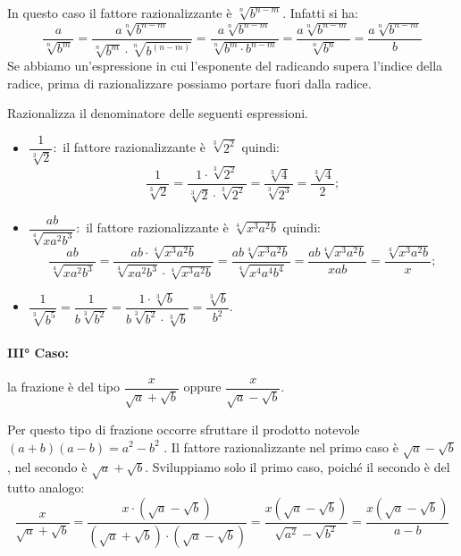 In questo caso il fattore razionalizzante è $\sqrt[n]{b^{n-m}}$. Infatti si ha:
\begin{equation*}
\dfrac a{\sqrt[n]{b^m}}=\dfrac{a\sqrt[n]{b^{n-m}}}{\sqrt[n]{b^m}\cdot \sqrt[n]{b^{(n-m)}}}=\dfrac{a\sqrt[n]{b^{n-m}}}{\sqrt[n]{b^m\cdot b^{n-m}}}=\dfrac{a\sqrt[n]{b^{n-m}}}{\sqrt[n]{b^n}}=\dfrac{a\sqrt[n]{b^{n-m}}} b
\end{equation*}
Se abbiamo un'espressione in cui l'esponente del radicando supera l'indice della radice, prima di razionalizzare possiamo portare fuori dalla radice.

\begin{exrig}
 \begin{esempio}
Razionalizza il denominatore delle seguenti espressioni.
\begin{itemize}
 \item $\dfrac 1{\sqrt[3]2}$:\, il fattore razionalizzante è $\sqrt[3]{2^2}$ quindi:\[\dfrac 1{\sqrt[3]2}=\dfrac{1\cdot \sqrt[3]{2^2}}{\sqrt[3]2\cdot \sqrt[3]{2^2}}=\dfrac{\sqrt[3]4}{\sqrt[3]{2^3}}=\dfrac{\sqrt[3]4} 2;\]
 \item $\dfrac{ab}{\sqrt[4]{xa^2b^3}}$:\, il fattore razionalizzante è $\sqrt[4]{x^3a^2b}$ quindi: \[\dfrac{ab}{\sqrt[4]{xa^2b^3}}=\dfrac{ab\cdot \sqrt[4]{x^3a^2b}}{\sqrt[4]{xa^2b^3}\cdot \sqrt[4]{x^3a^2b}}=\dfrac{ab\sqrt[4]{x^3a^2b}}{\sqrt[4]{x^4a^4b^4}}=\dfrac{ab\sqrt[4]{x^3a^2b}}{xab}=\dfrac{\sqrt[4]{x^3a^2b}} x;\]
 \item $\dfrac 1{\sqrt[3]{b^5}}=\dfrac 1{b\sqrt[3]{b^2}}=\dfrac{1\cdot \sqrt[3]b}{b\sqrt[3]{b^2}\cdot \sqrt[3]b}=\dfrac{\sqrt[3]b}{b^2}$.
\end{itemize}
 \end{esempio}
\end{exrig}


\paragraph{III° Caso:} la frazione è del tipo $\dfrac x{\sqrt a+\sqrt b}$ oppure $\dfrac x{\sqrt a-\sqrt b}$.

Per questo tipo di frazione occorre sfruttare il prodotto notevole $(a+b)(a-b)=a^2-b^2$ . Il fattore razionalizzante nel primo caso è $\sqrt a-\sqrt b$, nel secondo è $\sqrt a+\sqrt b$.
Sviluppiamo solo il primo caso, poiché il secondo è del tutto analogo:
\begin{equation*}
\dfrac x{\sqrt a+\sqrt b}=\dfrac{x\cdot (\sqrt a-\sqrt b)}{(\sqrt a+\sqrt b)\cdot (\sqrt a-\sqrt b)}=\dfrac{x(\sqrt a-\sqrt b)}{\sqrt{a^2}-\sqrt{b^2}}=\dfrac{x(\sqrt a-\sqrt b)}{a-b}
\end{equation*}


